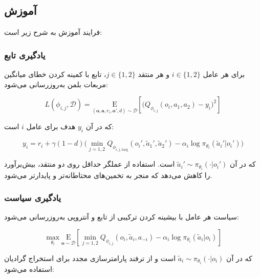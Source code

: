 
\subsection{آموزش }

فرایند آموزش  به شرح زیر است:

\subsubsection{یادگیری تابع }

برای هر عامل $i \in \{1, 2\}$ و هر منتقد $j \in \{1, 2\}$، تابع  با کمینه کردن خطای میانگین مربعات بلمن به‌روزرسانی می‌شود:

\begin{equation}
    L(\phi_{i,j}, \mathcal{D}) = \underset{(\boldsymbol{o}, \boldsymbol{a}, r_i, \boldsymbol{o}', d) \sim \mathcal{D}}{\mathrm{E}}\left[ 
    \Bigg( Q_{\phi_{i,j}}(o_i, a_1, a_2) - y_i \Bigg)^2
    \right]
\end{equation}

که در آن $y_i$ هدف برای عامل $i$ است:

\begin{equation}
    y_i = r_i + \gamma (1 - d) \Big( \min_{j=1,2} Q_{\phi_{i,j,\text{targ}}}(o_i', \tilde{a}_1', \tilde{a}_2') - \alpha_i \log \pi_{\theta_i}(\tilde{a}_i'|o_i') \Big)
\end{equation}

که در آن $\tilde{a}_i' \sim \pi_{\theta_i}(\cdot|o_i')$ است. استفاده از عملگر حداقل روی دو منتقد، بیش‌برآورد را کاهش می‌دهد که منجر به تخمین‌های محتاطانه‌تر و پایدارتر می‌شود.

\subsubsection{یادگیری سیاست}

سیاست هر عامل با بیشینه کردن ترکیبی از تابع  و آنتروپی به‌روزرسانی می‌شود:

\begin{equation}
    \max_{\theta_i} \underset{\boldsymbol{o} \sim \mathcal{D}}{\mathrm{E}}\left[ \min_{j=1,2}Q_{\phi_{i,j}}(o_i, \tilde{a}_i, a_{-i}) - \alpha_i \log \pi_{\theta_i}(\tilde{a}_i|o_i) \right]
\end{equation}

که در آن $\tilde{a}_i \sim \pi_{\theta_i}(\cdot|o_i)$ است و از ترفند پارامترسازی مجدد برای استخراج گرادیان استفاده می‌شود:


